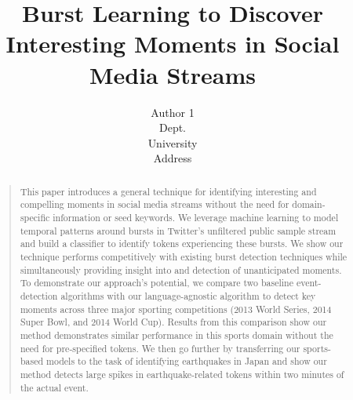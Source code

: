 \documentclass[letterpaper]{article}
\begin{document}
%
\title{Burst Learning to Discover Interesting Moments in Social Media Streams}
\author{Author 1\\
Dept. \\
University \\
Address \\
}
\maketitle
\begin{abstract}
\begin{quote}
This paper introduces a general technique for identifying interesting and compelling moments in social media streams without the need for domain-specific information or seed keywords.
We leverage machine learning to model temporal patterns around bursts in Twitter's unfiltered public sample stream and build a classifier to identify tokens experiencing these bursts.
We show our technique performs competitively with existing burst detection techniques while simultaneously providing insight into and detection of unanticipated moments.
To demonstrate our approach's potential, we compare two baseline event-detection algorithms with our language-agnostic algorithm to detect key moments across three major sporting competitions (2013 World Series, 2014 Super Bowl, and 2014 World Cup).
Results from this comparison show our method demonstrates similar performance in this sports domain without the need for pre-specified tokens.
We then go further by transferring our sports-based models to the task of identifying earthquakes in Japan and show our method detects large spikes in earthquake-related tokens within two minutes of the actual event.
\end{quote}
\end{abstract}

%
\end{document}
